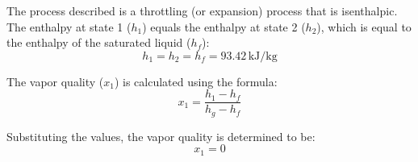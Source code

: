 The process described is a throttling (or expansion) process that is isenthalpic. The enthalpy at state 1 (\( h_1 \)) equals the enthalpy at state 2 (\( h_2 \)), which is equal to the enthalpy of the saturated liquid (\( h_f \)):  
\[
h_1 = h_2 = h_f = 93.42 \, \text{kJ/kg}
\]

The vapor quality (\( x_1 \)) is calculated using the formula:  
\[
x_1 = \frac{h_1 - h_f}{h_g - h_f}
\]

Substituting the values, the vapor quality is determined to be:  
\[
x_1 = 0
\]